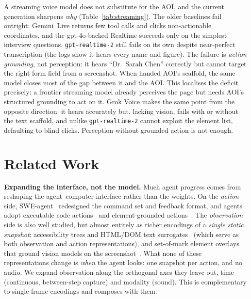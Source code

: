 \documentclass[11pt]{article}
\begin{document}
A streaming voice model does not substitute for the AOI, and the current generation
sharpens \emph{why} (Table~\ref{tab:streaming}).
The older baselines fail outright: Gemini~Live returns few tool calls and clicks
non-actionable coordinates, and the gpt-4o-backed Realtime succeeds only on the
simplest interview questions.
\texttt{gpt-realtime-2} still fails on its own despite near-perfect transcription
(the logs show it hears every name and figure). The failure is \emph{action grounding},
not perception: it hears ``Dr.\ Sarah Chen'' correctly but cannot target the right form field
from a screenshot. When handed AOI's scaffold, the same model closes most of the gap between
it and the AOI. This localises the deficit precisely: a frontier streaming model already
perceives the page but needs AOI's structured grounding to act on it.
Grok Voice makes the same point from the opposite direction: it hears accurately but,
lacking vision, fails with or without the text scaffold, and unlike \texttt{gpt-realtime-2}
cannot exploit the element list, defaulting to blind clicks. Perception without grounded
action is not enough.

\section{Related Work}
\label{sec:related}

\textbf{Expanding the interface, not the model.}
Much agent progress comes from reshaping the agent--computer interface rather than
the weights.
On the \emph{action} side, SWE-agent~\citep{sweagent} redesigned the command set and
feedback format, and agents adopt executable code actions~\citep{codeact} and
element-grounded actions~\citep{mind2web}.
The \emph{observation} side is also well studied, but almost entirely as richer
encodings of a \emph{single static snapshot}: accessibility trees and HTML/DOM text
surrogates~\citep{webarena,mind2web} (which serve as both observation and action
representations), and set-of-mark element overlays that ground vision models on the
screenshot~\citep{setofmark,seeact}.
What none of these representations change is \emph{when} the agent looks: one
snapshot per action, and no audio.
We expand observation along the orthogonal axes they leave out, time (continuous,
between-step capture) and modality (sound). This is complementary to single-frame
encodings and composes with them.
\end{document}

